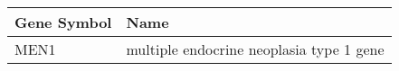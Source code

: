 \begin{tabular}{ll}
\toprule
Gene Symbol &                                     Name \\
\midrule
       MEN1 & multiple endocrine neoplasia type 1 gene \\
\bottomrule
\end{tabular}
